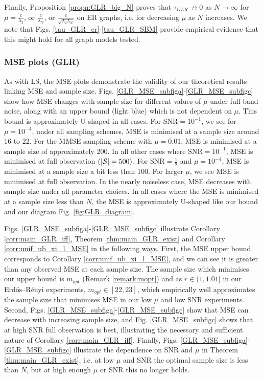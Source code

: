 Finally, Proposition \ref{propn:GLR_big_N} proves that $\tau_{GLR} \not\to 0$ as $N \to \infty$ for $\mu = \frac{c}{\lambda_{2}}$,  or $\frac{c}{\lambda_{N}}$, or $\frac{c}{\sqrt{\lambda_{2}\lambda_{N}} }$ on ER graphs, i.e. for decreasing $\mu$ as $N$ increases. We note that Figs. \ref{tau_GLR_er}-\ref{tau_GLR_SBM}  provide empirical evidence that this might hold for all graph models tested.


\subsubsection{MSE plots (GLR)}
As with LS, the MSE plots demonstrate the validity of our theoretical results linking MSE and sample size.
Figs. \ref{GLR_MSE_subfiga}-\ref{GLR_MSE_subfigc} show how MSE changes with sample size for different values of $\mu$ under full-band noise, along with an upper bound (light blue) which is not dependent on $\mu$. This bound is approximately U-shaped in all cases.
    For $\text{SNR} = 10^{-1}$, we see for $\mu=10^{-4}$, under all sampling schemes, MSE is minimised at a sample size around 16 to 22. For the MMSE sampling scheme with $\mu=0.01$, MSE is minimised at a sample size of approximately 200. In all other cases where $\text{SNR} = 10^{-1}$, MSE is minimised at full observation $(|\mathcal{S}|=500)$.
    For $\text{SNR}=\frac{1}{2}$ and $\mu=10^{-4}$, MSE is minimised at a sample size a bit less than 100. For larger $\mu$, we see MSE is minimised at full observation.
    In the nearly noiseless case, MSE decreases with sample size under all parameter choices. In all cases where the MSE is minimised at a sample size less than $N$, the MSE is approximately U-shaped like our bound {\color{black} and 
 our diagram Fig. \ref{fig:GLR_diagram}}.


Figs. \ref{GLR_MSE_subfiga}-\ref{GLR_MSE_subfigc} illustrate Corollary \ref{corr:main_GLR_iff}, Theorem \ref{thm:main_GLR_exist} and Corollary \ref{corr:unif_ub_xi_1_MSE} in the following ways. First, the MSE upper bound corresponds to Corollary \ref{corr:unif_ub_xi_1_MSE}, and we can see it is greater than any observed MSE at each sample size. The sample size which minimises our upper bound is $m_{opt}$ (Remark \ref{remark:mopt}) and as $r \in (1,1.01]$ in our Erdős–Rényi experiments, $m_{opt} \in [22,23]$, which empirically well approximates the sample size that minimises MSE in our low $\mu$ and low SNR experiments. %
Second, Figs. \ref{GLR_MSE_subfiga}-\ref{GLR_MSE_subfigc} show that MSE can decrease with increasing sample size, and Fig. \ref{GLR_MSE_subfigc} shows that at high SNR full observation is best, illustrating the necessary and sufficient nature of Corollary \ref{corr:main_GLR_iff}.
Finally, Figs. \ref{GLR_MSE_subfiga}-\ref{GLR_MSE_subfigc} illustrate the dependence on SNR and $\mu$ in Theorem \ref{thm:main_GLR_exist}, i.e. at low $\mu$ and SNR the optimal sample size is less than $N$, but at high enough $\mu$ or SNR this no longer holds.  

